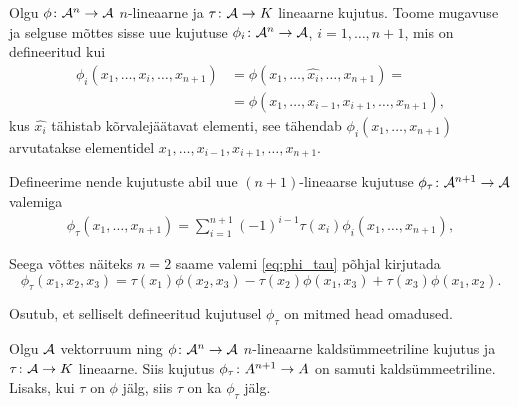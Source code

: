 Olgu $\phi \colon \mathcal{A}^n \to \mathcal{A}$ $n$-lineaarne ja
$\tau \colon \mathcal{A} \to K$ lineaarne kujutus. Toome mugavuse
ja selguse mõttes sisse uue kujutuse $\phi_i \colon \mathcal{A}^n \to \mathcal{A}$,
$i = 1, \dots, n+1$, mis on defineeritud kui
\begin{align*}
    \phi_i\left(x_1, \dots, x_i, \dots, x_{n+1}\right) &=
    \phi \left(x_1, \dots, \hat{x_i}, \dots, x_{n+1}\right) = \\
    &= \phi \left(x_1, \dots, x_{i-1}, x_{i+1}, \dots, x_{n+1}\right),
\end{align*}
kus $\hat{x_i}$ tähistab kõrvalejäätavat elementi, see tähendab
$\phi_i(x_1, \dots, x_{n+1})$ arvutatakse elementidel
$x_1, \dots, x_{i-1}, x_{i+1}, \dots, x_{n+1}$.

Defineerime nende
kujutuste abil uue $(n+1)$-lineaarse kujutuse
$\phi_\tau \colon \mathcal{A}^{n+1} \to \mathcal{A}$ valemiga
\begin{align}\label{eq:phi_tau}
    \phi_\tau \left( x_1, \dots, x_{n+1} \right) =
    \sum_{i=1}^{n+1} (-1)^{i-1} \tau(x_i)
        \phi_i(x_1, \dots, x_{n+1}),
\end{align}


Seega võttes näiteks $n = 2$ saame valemi \eqref{eq:phi_tau}
põhjal kirjutada
\[
    \phi_\tau (x_1, x_2, x_3) =
        \tau(x_1) \phi(x_2, x_3) -
        \tau(x_2) \phi(x_1, x_3) +
        \tau(x_3) \phi(x_1, x_2).
\]

Osutub, et selliselt defineeritud kujutusel $\phi_\tau$ on
mitmed head omadused.

\begin{lemma}
    Olgu $\mathcal{A}$ vektorruum ning $\phi \colon \mathcal{A}^n \to \mathcal{A}$ $n$-lineaarne
    kaldsümmeetriline kujutus ja $\tau \colon \mathcal{A} \to K$ lineaarne.
    Siis kujutus $\phi_\tau \colon A^{n+1} \to A$ on samuti
    kaldsümmeetriline. Lisaks, kui $\tau$ on $\phi$ jälg, siis
    $\tau$ on ka $\phi_\tau$ jälg.
\end{lemma}

